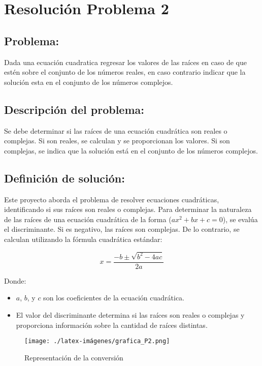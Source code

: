 \section{Resolución Problema 2} 
\subsection{Problema:}
Dada una ecuación cuadratica regresar los valores de las raíces en caso de que estén sobre el conjunto de los números reales, en caso contrario indicar que la solución esta en el conjunto de los números complejos. 

\subsection{\textbf{Descripción del problema:}}
Se debe determinar si las raíces de una ecuación cuadrática 
son reales o complejas. Si son reales, se calculan y 
se proporcionan los valores. Si son complejas, se 
indica que la solución está en el conjunto de los números complejos.

\subsection{\textbf{Definición de solución:}}
Este proyecto aborda el problema de resolver ecuaciones cuadráticas, identificando si sus raíces son reales o complejas. 
Para determinar la naturaleza de las raíces de una ecuación cuadrática de la forma  (\(ax^2 + bx + c = 0\)), se evalúa el discriminante. Si es negativo, las raíces son complejas. De lo contrario, se calculan utilizando la fórmula cuadrática estándar:

\begin{equation}
    x = \frac{-b \pm \sqrt{b^2 - 4ac}}{2a} 
    \label{eqn:formulaGeneral}
\end{equation}

Donde:
\begin{itemize}
    \item \(a\), \(b\), y \(c\) son los coeficientes de la ecuación cuadrática.
    \item El valor del discriminante determina si las raíces son reales o complejas y proporciona información sobre la cantidad de raíces distintas.
\end{itemize}


\begin{figure}[h!]
    \centering
    \texttt{[image: ./latex-imágenes/grafica\_P2.png]}
    \caption{Representación de la conversión}
    \label{fig: Grafica Ecuacion Recta}
\end{figure}

